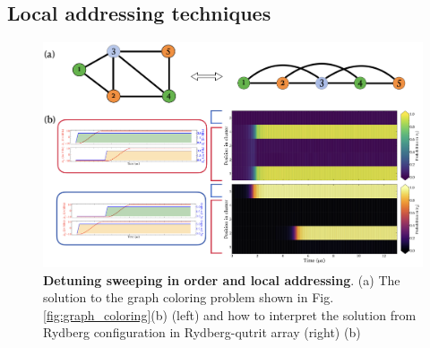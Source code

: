 \documentclass[%
 reprint,
nofootinbib,
 amsmath,amssymb,
 aps,
pra,
floatfix,
]{revtex4-2}
\begin{document}
\subsection{Local addressing techniques}
\begin{figure}[t!]
    \centering
    \includegraphics[width=13cm]{picture/case1_ultimate.png}
    \caption{\textbf{Detuning sweeping in order and local addressing}. (a) The solution to the graph coloring problem shown in Fig.\ref{fig:graph_coloring}(b) (left) and how to interpret the solution from Rydberg configuration in Rydberg-qutrit array (right) (b) }
    \label{fig:case1_ultimate}
\end{figure}
\end{document}
